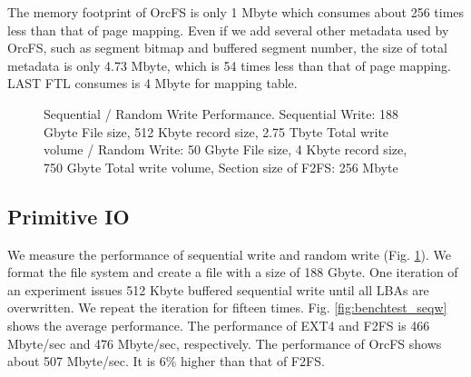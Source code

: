\documentclass[prodmode,acmtecs]{acmsmall}
\begin{document}
The memory footprint of OrcFS is only 1 Mbyte which consumes
about 256 times less than that of page mapping. Even if we add several
other metadata used by OrcFS, such as segment bitmap and buffered
segment number, the size of total metadata is only 4.73 Mbyte, which
is 54 times less than that of page mapping. LAST FTL consumes is 4 Mbyte
for mapping table.


\begin{figure}[t]
\centering

 \caption{Sequential / Random Write Performance. Sequential Write: 188
   Gbyte File size, 512 Kbyte record size, 2.75 Tbyte Total write
   volume / Random Write: 50 Gbyte File size, 4 Kbyte record size, 750
   Gbyte Total write volume, Section size of F2FS: 256 Mbyte}
 \label{fig:benchtest}
\end{figure}


\subsection{Primitive IO}
\label{subsec:io_performance}


We measure the performance of sequential write and random write
(Fig. \ref{fig:benchtest}).  We format the file system and create a
file with a size of 188 Gbyte. One iteration of an experiment issues
512 Kbyte buffered sequential write until all LBAs are overwritten. We
repeat the iteration for fifteen times.  Fig. \ref{fig:benchtest_seqw}
shows the average performance. The performance of EXT4 and F2FS is 466
Mbyte/sec and 476 Mbyte/sec, respectively. The performance of OrcFS
shows about 507 Mbyte/sec. It is 6$\%$ higher than that of F2FS.
\end{document}

